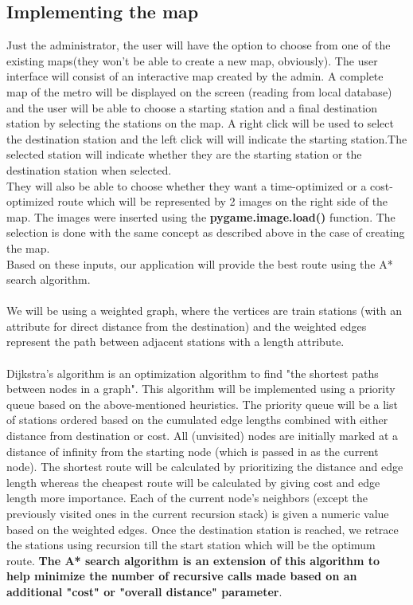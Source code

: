 \documentclass[fontsize=11pt]{article}
\begin{document}
    \subsection*{Implementing the map}
    Just the administrator, the user will have the option to choose from one of the existing maps(they won't be able to create a new map, obviously). The user interface will consist of an interactive map created by the admin. A complete map of the metro will be displayed on the screen (reading from local database) and the user will be able to choose a starting station and a final destination station by selecting the stations on the map. A right click will be used to select the destination station and the left click will will indicate the starting station.The selected station will indicate whether they are the starting station or the destination station when selected.\\
    They will also be able to choose whether they want a time-optimized or a cost-optimized route which will be represented by 2 images on the right side of the map. The images were inserted using the \textbf{pygame.image.load()} function. The selection is done with the same concept as described above in the case of creating the map.\\
    Based on these inputs, our application will provide the best route using the A* search algorithm.\\
    \\
    We will be using a weighted graph, where the vertices are train stations (with an attribute for direct distance from the destination) and the weighted edges represent the path between adjacent stations with a length attribute. \\
    \\
    Dijkstra's algorithm is an optimization algorithm to find "the shortest paths between nodes in a graph". This algorithm will be implemented using a priority queue based on the above-mentioned heuristics. The priority queue will be a list of stations ordered based on the cumulated edge lengths combined with either distance from destination or cost. All (unvisited) nodes are initially marked at a distance of infinity from the starting node (which is passed in as the current node). The shortest route will be calculated by prioritizing the distance and edge length whereas the cheapest route will be calculated by giving cost and edge length more importance. Each of the current node's neighbors (except the previously visited ones in the current recursion stack) is given a numeric value based on the weighted edges. Once the destination station is reached, we retrace the stations using recursion till the start station which will be the optimum route. \textbf{The A* search algorithm is an extension of this algorithm to help minimize the number of recursive calls made based on an additional "cost" or "overall distance" parameter}.\\
\end{document}
